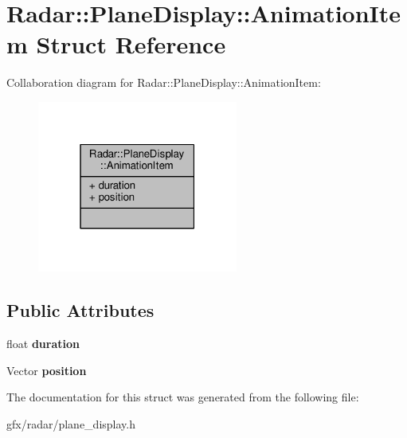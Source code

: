 \hypertarget{structRadar_1_1PlaneDisplay_1_1AnimationItem}{}\section{Radar\+:\+:Plane\+Display\+:\+:Animation\+Item Struct Reference}
\label{structRadar_1_1PlaneDisplay_1_1AnimationItem}


Collaboration diagram for Radar\+:\+:Plane\+Display\+:\+:Animation\+Item\+:
\nopagebreak
\begin{figure}[H]
\begin{center}
\leavevmode
\includegraphics[width=187pt]{df/d95/structRadar_1_1PlaneDisplay_1_1AnimationItem__coll__graph}
\end{center}
\end{figure}
\subsection*{Public Attributes}
\begin{DoxyCompactItemize}
\item 
float {\bfseries duration}\hypertarget{structRadar_1_1PlaneDisplay_1_1AnimationItem_a2af9aa76cdf7ebe9d94f2e746c0609db}{}\label{structRadar_1_1PlaneDisplay_1_1AnimationItem_a2af9aa76cdf7ebe9d94f2e746c0609db}

\item 
Vector {\bfseries position}\hypertarget{structRadar_1_1PlaneDisplay_1_1AnimationItem_a0d74468d051171e32b17bf311c2fe0cf}{}\label{structRadar_1_1PlaneDisplay_1_1AnimationItem_a0d74468d051171e32b17bf311c2fe0cf}

\end{DoxyCompactItemize}


The documentation for this struct was generated from the following file\+:\begin{DoxyCompactItemize}
\item 
gfx/radar/plane\+\_\+display.\+h\end{DoxyCompactItemize}
